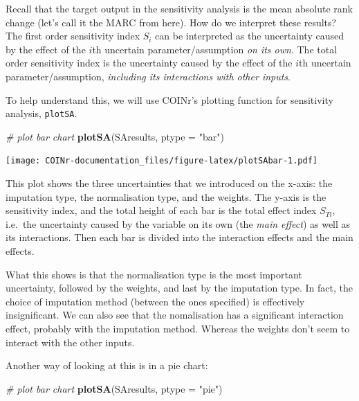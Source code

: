 \documentclass[
]{book}
\newenvironment{Shaded}{\begin{snugshade}}{\end{snugshade}}
\newcommand{\CommentTok}[1]{\textcolor[rgb]{0.56,0.35,0.01}{\textit{#1}}}
\newcommand{\DataTypeTok}[1]{\textcolor[rgb]{0.13,0.29,0.53}{#1}}
\newcommand{\KeywordTok}[1]{\textcolor[rgb]{0.13,0.29,0.53}{\textbf{#1}}}
\newcommand{\NormalTok}[1]{#1}
\newcommand{\StringTok}[1]{\textcolor[rgb]{0.31,0.60,0.02}{#1}}
\begin{document}
Recall that the target output in the sensitivity analysis is the mean absolute rank change (let's call it the MARC from here). How do we interpret these results? The first order sensitivity index \(S_i\) can be interpreted as the uncertainty caused by the effect of the \(i\)th uncertain parameter/assumption \emph{on its own}. The total order sensitivity index is the uncertainty caused by the effect of the \(i\)th uncertain parameter/assumption, \emph{including its interactions with other inputs}.

To help understand this, we will use COINr's plotting function for sensitivity analysis, \texttt{plotSA}.

\begin{Shaded}
\begin{Highlighting}[]
\CommentTok{# plot bar chart}
\KeywordTok{plotSA}\NormalTok{(SAresults, }\DataTypeTok{ptype =} \StringTok{"bar"}\NormalTok{)}
\end{Highlighting}
\end{Shaded}

\texttt{[image: COINr-documentation\_files/figure-latex/plotSAbar-1.pdf]}

This plot shows the three uncertainties that we introduced on the x-axis: the imputation type, the normalisation type, and the weights. The y-axis is the sensitivity index, and the total height of each bar is the total effect index \(S_{Ti}\), i.e.~the uncertainty caused by the variable on its own (the \emph{main effect}) as well as its interactions. Then each bar is divided into the interaction effects and the main effects.

What this shows is that the normalisation type is the most important uncertainty, followed by the weights, and last by the imputation type. In fact, the choice of imputation method (between the ones specified) is effectively insignificant. We can also see that the nomalisation has a significant interaction effect, probably with the imputation method. Whereas the weights don't seem to interact with the other inputs.

Another way of looking at this is in a pie chart:

\begin{Shaded}
\begin{Highlighting}[]
\CommentTok{# plot bar chart}
\KeywordTok{plotSA}\NormalTok{(SAresults, }\DataTypeTok{ptype =} \StringTok{"pie"}\NormalTok{)}
\end{Highlighting}
\end{Shaded}
\end{document}
